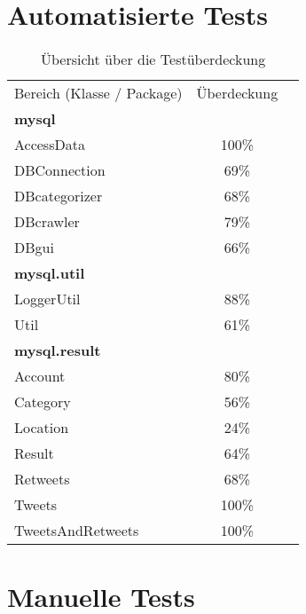 \section{Automatisierte Tests}

\begin{table}[h]
\begin{tabular} {lcr}
Bereich (Klasse / Package) & Überdeckung \\
		\textbf{mysql} &  \\
		AccessData & 100\% \\
		DBConnection & 69\% \\
		DBcategorizer & 68\% \\
		DBcrawler & 79\% \\
		DBgui & 66\% \\
		\textbf{mysql.util} &  \\
		LoggerUtil & 88\% \\
		Util & 61\% \\
		\textbf{mysql.result} &  \\
		Account & 80\% \\
		Category & 56\% \\
		Location & 24\% \\
		Result & 64\% \\
		Retweets & 68\% \\
		Tweets & 100\% \\
		TweetsAndRetweets & 100\% \\
	\end{tabular}
	\caption{Übersicht über die Testüberdeckung}
\end{table}

\section{Manuelle Tests}